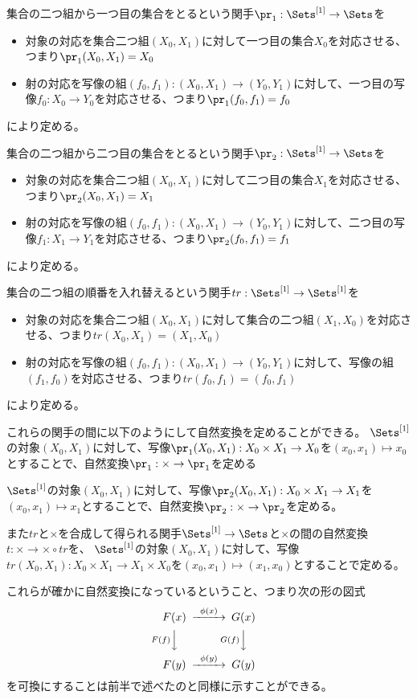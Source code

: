 \documentclass{jsarticle}
\begin{document}
集合の二つ組から一つ目の集合をとるという関手$\pr_1:\Sets^{[1]} \to \Sets$を
\begin{itemize}
\item 対象の対応を集合二つ組$(X_0,X_1)$に対して一つ目の集合$X_0$を対応させる、つまり$\pr_1(X_0,X_1)=X_0$
\item 射の対応を写像の組$(f_0,f_1):(X_0,X_1) \to (Y_0,Y_1)$に対して、一つ目の写像$f_0:X_0\to Y_0$を対応させる、つまり$\pr_1(f_0,f_1)=f_0$
\end{itemize}
により定める。

集合の二つ組から二つ目の集合をとるという関手$\pr_2:\Sets^{[1]} \to \Sets$を
\begin{itemize}
\item 対象の対応を集合二つ組$(X_0,X_1)$に対して二つ目の集合$X_1$を対応させる、つまり$\pr_2(X_0,X_1)=X_1$
\item 射の対応を写像の組$(f_0,f_1):(X_0,X_1) \to (Y_0,Y_1)$に対して、二つ目の写像$f_1:X_1\to Y_1$を対応させる、つまり$\pr_2(f_0,f_1)=f_1$
\end{itemize}
により定める。

集合の二つ組の順番を入れ替えるという関手$tr:\Sets^{[1]} \to \Sets^{[1]}$を
\begin{itemize}
\item 対象の対応を集合二つ組$(X_0,X_1)$に対して集合の二つ組$(X_1,X_0)$を対応させる、つまり$tr(X_0,X_1)=(X_1,X_0)$
\item 射の対応を写像の組$(f_0,f_1):(X_0,X_1) \to (Y_0,Y_1)$に対して、写像の組$(f_1,f_0)$を対応させる、つまり$tr(f_0,f_1)=(f_0,f_1)$
\end{itemize}
により定める。

これらの関手の間に以下のようにして自然変換を定めることができる。
$\Sets^{[1]}$の対象$(X_0, X_1)$に対して、写像$\pr_1(X_0,X_1):X_0 \times X_1 \to X_0$を$(x_0, x_1) \mapsto x_0$とすることで、自然変換$\pr_1:\times \to \pr_1$を定める

$\Sets^{[1]}$の対象$(X_0, X_1)$に対して、写像$\pr_2(X_0,X_1):X_0 \times X_1 \to X_1$を$(x_0, x_1) \mapsto x_1$とすることで、自然変換$\pr_2:\times \to \pr_2$を定める。

また$tr$と$\times$を合成して得られる関手$\Sets^{[1]} \to \Sets$と$\times$の間の自然変換$t:\times \to \times \circ tr$を、
$\Sets^{[1]}$の対象$(X_0, X_1)$に対して、写像$tr(X_0,X_1):X_0 \times X_1 \to X_1 \times X_0$を$(x_0, x_1) \mapsto (x_1,x_0)$とすることで定める。

これらが確かに自然変換になっているということ、つまり次の形の図式
\[
\begin{CD}
F(x)@>\phi(x)>>G(x)\\
@VF(f)VV@VG(f)VV\\
F(y)@>\phi(y)>>G(y)
\end{CD}
\]
を可換にすることは前半で述べたのと同様に示すことができる。
\end{document}
